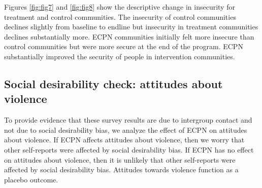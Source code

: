 \documentclass[11pt]{article}
\begin{document}
Figures \ref{fig:fig7} and \ref{fig:fig8} show the descriptive change in
insecurity for treatment and control communities. The insecurity of
control communities declines slightly from baseline to endline but
insecurity in treatment communities declines substantially more. ECPN
communities initially felt more insecure than control communities but
were more secure at the end of the program. ECPN substantially improved
the security of people in intervention communities.

\hypertarget{social-desirability-check-attitudes-about-violence}{%
\subsection{Social desirability check: attitudes about
violence}\label{social-desirability-check-attitudes-about-violence}}

To provide evidence that these survey results are due to intergroup
contact and not due to social desirability bias, we analyze the effect
of ECPN on attitudes about violence. If ECPN affects attitudes about
violence, then we worry that other self-reports were affected by social
desirability bias. If ECPN has no effect on attitudes about violence,
then it is unlikely that other self-reports were affected by social
desirability bias. Attitudes towards violence function as a placebo
outcome.
\end{document}
